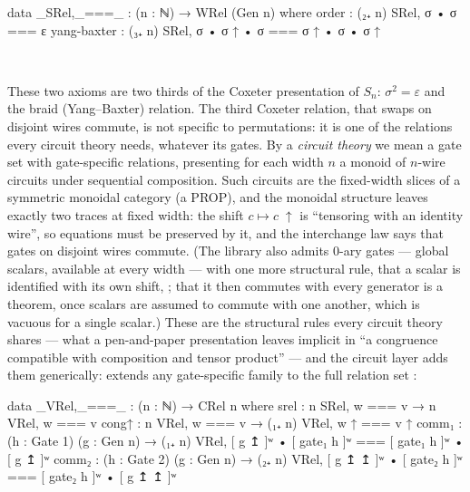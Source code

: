 \begin{center}
\begin{minipage}[c]{0.58\linewidth}
\begingroup\setlength{\mathindent}{0pt}
\begin{code}
data _SRel,_===_ : (n : ℕ) → WRel (Gen n) where
  order       : (₂₊ n) SRel, σ • σ === ε
  yang-baxter : (₃₊ n) SRel, σ • σ ↑ • σ === σ ↑ • σ • σ ↑
\end{code}
\endgroup
\end{minipage}\hspace{2.5em}%
\begin{minipage}[c]{0.28\linewidth}\centering
  \\[4pt]
\end{minipage}
\end{center}

\noindent These two axioms are two thirds of the Coxeter presentation of
$S_n$: $\sigma^2 = \varepsilon$ and the braid (Yang--Baxter) relation.
The third Coxeter relation, that swaps on disjoint wires commute, is not
specific to permutations: it is one of the relations every circuit
theory needs, whatever its gates.  By a
\emph{circuit theory} we mean a gate set with gate-specific relations,
presenting for each width $n$ a monoid of $n$-wire circuits under
sequential composition.  Such circuits are the fixed-width slices of a
symmetric monoidal category (a PROP), and the monoidal structure leaves
exactly two traces at fixed width: the shift $c \mapsto c\;{\uparrow}$ is
``tensoring with an identity wire'', so equations must be preserved by
it, and the interchange law says that gates on disjoint wires commute.
(The library also admits $0$-ary gates --- global scalars, available at
every width --- with one more structural rule, that a scalar is
identified with its own shift, ; that it then commutes with
every generator is a theorem, once scalars are assumed to commute with
one another, which is vacuous for a single scalar.)  These are the structural rules every
circuit theory shares --- what a
pen-and-paper presentation leaves implicit in ``a congruence compatible
with composition and tensor product'' --- and the circuit layer adds them
generically:  extends any
gate-specific family to the full relation set :

\begin{code}
data _VRel,_===_ : (n : ℕ) → CRel n where
  srel  : n SRel, w === v → n VRel, w === v
  cong↑ : n VRel, w === v → (₁₊ n) VRel, w ↑ === v ↑
  comm₁ : (h : Gate 1) (g : Gen n) → (₁₊ n) VRel, [ g ↥ ]ʷ • [ gate₁ h ]ʷ === [ gate₁ h ]ʷ • [ g ↥ ]ʷ
  comm₂ : (h : Gate 2) (g : Gen n) → (₂₊ n) VRel, [ g ↥ ↥ ]ʷ • [ gate₂ h ]ʷ === [ gate₂ h ]ʷ • [ g ↥ ↥ ]ʷ
\end{code}

